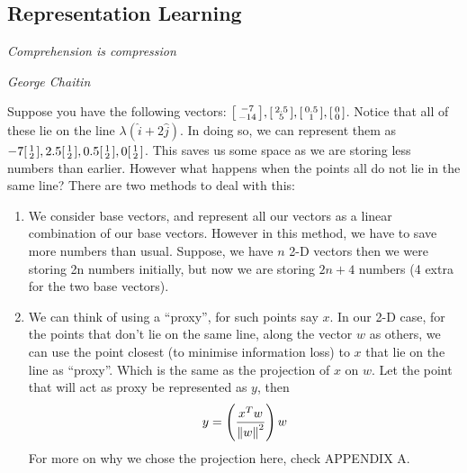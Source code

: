 \documentclass[12pt,a4paper]{article}
\begin{document}
\subsection{Representation Learning}
\epigraph{\textit{Comprehension is compression}}{\textit{George Chaitin}}
\noindent Suppose you have the following vectors: $\begin{bsmallmatrix}
    -7 \\ -14
\end{bsmallmatrix}, \begin{bsmallmatrix}
    2.5 \\ 5
\end{bsmallmatrix}, \begin{bsmallmatrix}
    0.5 \\ 1 
\end{bsmallmatrix}, \begin{bsmallmatrix}
    0 \\ 0
\end{bsmallmatrix}$. Notice that all of these lie on the line $\lambda(\hat{i}+2\hat{j})$. In doing so, we can represent them as $-7\begin{bsmallmatrix}
    1 \\ 2
\end{bsmallmatrix}, 2.5 \begin{bsmallmatrix}
    1 \\ 2
\end{bsmallmatrix}, 0.5 \begin{bsmallmatrix}
    1 \\ 2
\end{bsmallmatrix}, 0 \begin{bsmallmatrix}
    1 \\ 2
\end{bsmallmatrix}$. This saves us some space as we are storing less numbers than earlier. However what happens when the points all do not lie in the same line?
There are two methods to deal with this:
\begin{enumerate}
    \item We consider base vectors, and represent all our vectors as a linear combination of our base vectors. However in this method, we have to save more numbers than usual. Suppose, we have $n$ 2-D vectors then we were storing 2n numbers initially, but now we are storing $2n+4$ numbers (4 extra for the two base vectors).
    \item We can think of using a ``proxy'', for such points say $x$. In our 2-D case, for the points that don't lie on the same line, along the vector $w$ as others, we can use the point closest (to minimise information loss) to $x$ that lie on the line as ``proxy''. Which is the same as the projection of $x$ on $w$. Let the point that will act as proxy be represented as $y$, then $$y= \left(\dfrac{x^Tw}{\norm{w}^2} \right) w$$
    For more on why we chose the projection here, check APPENDIX A.
\end{enumerate}
\end{document}
